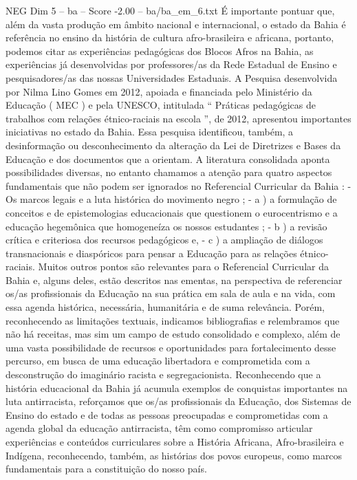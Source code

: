 \begin{textsample}{NEG Dim 5 – ba – Score -2.00 – ba/ba\_em\_6.txt}
É importante pontuar que, além da vasta produção em âmbito nacional e internacional, o estado da Bahia é referência no ensino da história de cultura afro-brasileira e africana, portanto, podemos citar as experiências pedagógicas dos Blocos Afros na Bahia, as experiências já desenvolvidas por professores/as da Rede Estadual de Ensino e pesquisadores/as das nossas Universidades Estaduais.
A Pesquisa desenvolvida por Nilma Lino Gomes em 2012, apoiada e financiada pelo Ministério da Educação ( MEC ) e pela UNESCO, intitulada “ Práticas pedagógicas de trabalhos com relações étnico-raciais na escola ”, de 2012, apresentou importantes iniciativas no estado da Bahia.
Essa pesquisa identificou, também, a desinformação ou desconhecimento da alteração da Lei de Diretrizes e Bases da Educação e dos documentos que a orientam.
A literatura consolidada aponta possibilidades diversas, no entanto chamamos a atenção para quatro aspectos fundamentais que não podem ser ignorados no Referencial Curricular da Bahia : - Os marcos legais e a luta histórica do movimento negro ; - a ) a formulação de conceitos e de epistemologias educacionais que questionem o eurocentrismo e a educação hegemônica que homogeneíza os nossos estudantes ; - b ) a revisão crítica e criteriosa dos recursos pedagógicos e, - c ) a ampliação de diálogos transnacionais e diaspóricos para pensar a Educação para as relações étnico-raciais.
Muitos outros pontos são relevantes para o Referencial Curricular da Bahia e, alguns deles, estão descritos nas ementas, na perspectiva de referenciar os/as profissionais da Educação na sua prática em sala de aula e na vida, com essa agenda histórica, necessária, humanitária e de suma relevância.
Porém, reconhecendo as limitações textuais, indicamos bibliografias e relembramos que não há receitas, mas sim um campo de estudo consolidado e complexo, além de uma vasta possibilidade de recursos e oportunidades para fortalecimento desse percurso, em busca de uma educação libertadora e comprometida com a desconstrução do imaginário racista e segregacionista.
Reconhecendo que a história educacional da Bahia já acumula exemplos de conquistas importantes na luta antirracista, reforçamos que os/as profissionais da Educação, dos Sistemas de Ensino do estado e de todas as pessoas preocupadas e comprometidas com a agenda global da educação antirracista, têm como compromisso articular experiências e conteúdos curriculares sobre a História Africana, Afro-brasileira e Indígena, reconhecendo, também, as histórias dos povos europeus, como marcos fundamentais para a constituição do nosso país.

\end{textsample}
